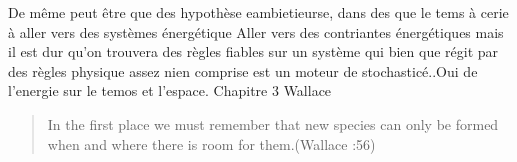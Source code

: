 De même peut être que des hypothèse eambietieurse, dans des que le tems
à cerie à aller vers des systèmes énergétique Aller vers des contriantes
énergétiques mais il est dur qu'on trouvera des règles fiables sur un
système qui bien que régit par des règles physique assez nien comprise
est un moteur de stochasticé..Oui de l'energie sur le temos et l'espace.
Chapitre 3 Wallace

\begin{quote}
In the first place we must remember that new species can only be formed
when and where there is room for them.(Wallace :56)
\end{quote}
